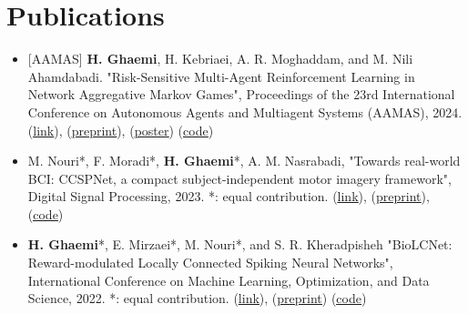 \documentclass[A4,11pt]{article}
\makeatletter
\newcommand{\CVItem}[1]{
  \item\small{
    {#1 \vspace{-2pt}}
  }
}
\newcommand{\CVSubheading}[4]{
  \vspace{-2pt}\item
    \begin{tabular*}{0.97\textwidth}[t]{l@{\extracolsep{\fill}}r}
      \textbf{#1} & #2 \\
      \small#3 & \small #4 \\
    \end{tabular*}\vspace{-7pt}
}
\newcommand{\CVItemListStart}{\begin{itemize}}
\newcommand{\CVItemListEnd}{\end{itemize}\vspace{-5pt}}
\makeatother
\begin{document}

\section{Publications}
\CVItemListStart
\CVItem{[AAMAS] \textbf{H. Ghaemi}, H. Kebriaei, A. R. Moghaddam, and M. Nili Ahamdabadi. "Risk-Sensitive Multi-Agent Reinforcement Learning in Network Aggregative Markov Games", Proceedings of the 23rd International Conference on Autonomous Agents and Multiagent Systems (AAMAS), 2024. (\href{https://dl.acm.org/doi/10.5555/3635637.3663134}{\underline{link}}), (\href{https://arxiv.org/abs/2402.05906}{\underline{preprint}}), (\href{https://github.com/hafezgh/risk-sensitive-marl-namg/blob/main/Poster_RSMARL_AAMAS2024.pdf}{\underline{poster}}) (\href{https://github.com/hafezgh/risk-sensitive-marl-namg/}{\underline{code}})}

\CVItem{M. Nouri*, F. Moradi*, \textbf{H. Ghaemi}*, A. M. Nasrabadi, "Towards real-world BCI: CCSPNet, a compact subject-independent motor imagery framework", Digital Signal Processing, 2023. *: equal contribution. (\href{https://doi.org/10.1016/j.dsp.2022.103816}{\underline{link}}), (\href{https://arxiv.org/abs/2012.13567}{\underline{preprint}}), (\href{https://github.com/Singular-Brain/CCSPNet}{\underline{code}})}

\CVItem{\textbf{H. Ghaemi}*, E. Mirzaei*, M. Nouri*, and S. R. Kheradpisheh "BioLCNet: Reward-modulated Locally Connected Spiking Neural Networks", International Conference on Machine Learning, Optimization, and Data Science, 2022. *: equal contribution. (\href{https://doi.org/10.1007/978-3-031-25891-6_42}{\underline{link}}), (\href{https://arxiv.org/abs/2109.05539}{\underline{preprint}}) (\href{https://github.com/Singular-Brain/BioLCNet}{\underline{code}})}


\CVItemListEnd


\end{document}
